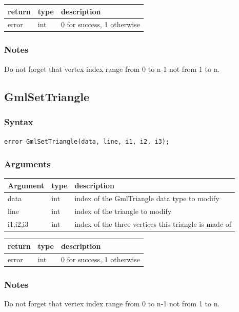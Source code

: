 \documentclass[a4paper,12pt]{article}
\begin{document}
\medskip

\begin{tabular}{|m{2cm}|m{1.5cm}|m{10.5cm}|}
\hline
return     & type   & description \\
\hline
error      & int    & 0 for success, 1 otherwise \\
\hline
\end{tabular}
\subsubsection*{Notes}
Do not forget that vertex index range from 0 to n-1 not from 1 to n.


\subsection{GmlSetTriangle}
\subsubsection*{Syntax}
{\tt error GmlSetTriangle(data, line, i1, i2, i3);}
\subsubsection*{Arguments}

\begin{tabular}{|m{2cm}|m{1.5cm}|m{10.5cm}|}
\hline
Argument   & type   & description \\
\hline
data       & int    & index of the GmlTriangle data type to modify \\
\hline
line       & int    & index of the triangle to modify \\
\hline
i1,i2,i3   & int    & index of the three vertices this triangle is made of \\
\hline
\end{tabular}

\medskip

\begin{tabular}{|m{2cm}|m{1.5cm}|m{10.5cm}|}
\hline
return     & type   & description \\
\hline
error      & int    & 0 for success, 1 otherwise \\
\hline
\end{tabular}
\subsubsection*{Notes}
Do not forget that vertex index range from 0 to n-1 not from 1 to n.
\end{document}
